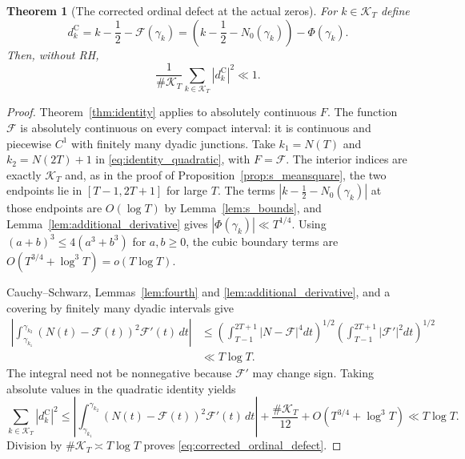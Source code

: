 \documentclass[11pt,a4paper]{article}
\makeatletter
\numberwithin{equation}{section}
\DeclareRobustCommand{\CGref}[1]{\ref{#1}}
\DeclareRobustCommand{\CGeqref}[1]{\eqref{#1}}
\let\CG@origref\ref
\let\CG@origeqref\eqref
\newcommand{\CG@gettip}[1]{\@ifundefined{CGTip@#1}{#1}{\csname CGTip@#1\endcsname}}
\DeclareRobustCommand{\CGref}[1]{\pdftooltip{\CG@origref{#1}}{\CG@gettip{#1}}}
\DeclareRobustCommand{\CGeqref}[1]{\pdftooltip{\CG@origeqref{#1}}{\CG@gettip{#1}}}
\newtheorem{theorem}{Theorem}[section]
\theoremstyle{definition}
\theoremstyle{remark}
\newcommand{\Nz}{N_0} %
\newcommand{\Fc}{\mathcal F}
\newcommand{\Ph}{\Phi}
\makeatother
\begin{document}
\begin{theorem}[The corrected ordinal defect at the actual zeros]\label{thm:corrected_ordinal_defect}
For $k\in\mathcal K_T$ define
\begin{equation}
 d_k^{\mathrm C}=k-\frac12-\Fc(\gamma_k)
 =\left(k-\frac12-\Nz(\gamma_k)\right)-\Ph(\gamma_k).
\label{eq:disp_43}
\end{equation}
Then, without RH,
\begin{equation}
\frac1{\#\mathcal K_T}\sum_{k\in\mathcal K_T}
|d_k^{\mathrm C}|^2\ll1.
\label{eq:corrected_ordinal_defect}
\end{equation}
\end{theorem}
\begin{proof}
Theorem~\CGref{thm:identity} applies to absolutely continuous $F$.
The function $\Fc$ is absolutely continuous on every compact interval:
it is continuous and piecewise $C^1$ with finitely many dyadic junctions.
Take $k_1=N(T)$ and $k_2=N(2T)+1$ in
\CGeqref{eq:identity_quadratic}, with $F=\Fc$. The interior indices are
exactly $\mathcal K_T$ and, as in the proof of
Proposition~\CGref{prop:s_meansquare}, the two endpoints lie in
$[T-1,2T+1]$ for large $T$. The terms
$|k-\frac12-\Nz(\gamma_k)|$ at those endpoints are $O(\log T)$ by
Lemma~\CGref{lem:s_bounds}, and Lemma~\CGref{lem:additional_derivative}
gives $|\Ph(\gamma_k)|\ll T^{1/4}$.
Using $(a+b)^3\le4(a^3+b^3)$ for $a,b\ge0$, the cubic boundary terms are $O(T^{3/4}+\log^3T)=o(T\log T)$.

Cauchy--Schwarz, Lemmas~\CGref{lem:fourth} and
\CGref{lem:additional_derivative}, and a covering by finitely many dyadic
intervals give
\begin{equation}
\begin{aligned}
\left|\int_{\gamma_{k_1}}^{\gamma_{k_2}}
(N(t)-\Fc(t))^2\Fc'(t)\,dt\right|
&\le\left(\int_{T-1}^{2T+1}|N-\Fc|^4dt\right)^{1/2}
\left(\int_{T-1}^{2T+1}|\Fc'|^2dt\right)^{1/2}\\
&\ll T\log T.
\end{aligned}
\label{eq:disp_44}
\end{equation}
The integral need not be nonnegative because $\Fc'$ may change sign.
Taking absolute values in the quadratic identity yields
\begin{equation}
\sum_{k\in\mathcal K_T}|d_k^{\mathrm C}|^2
\le\left|\int_{\gamma_{k_1}}^{\gamma_{k_2}}
(N(t)-\Fc(t))^2\Fc'(t)\,dt\right|
+\frac{\#\mathcal K_T}{12}+O(T^{3/4}+\log^3T)
\ll T\log T.
\label{eq:disp_45}
\end{equation}
Division by $\#\mathcal K_T\asymp T\log T$ proves
\CGeqref{eq:corrected_ordinal_defect}.
\end{proof}
\end{document}
